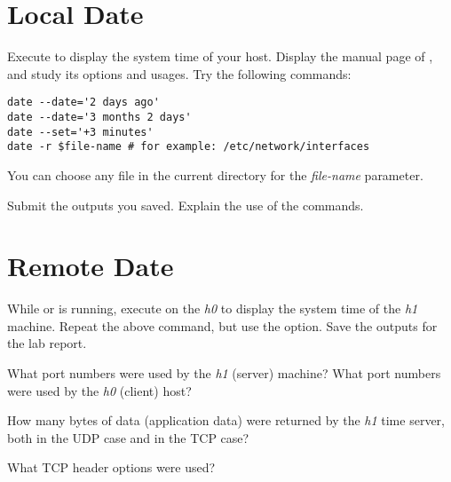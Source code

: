 \documentclass{../UTNetLab}
\begin{document}
\section{Local Date}
Execute  to display the system time of your host.
Display the manual page of , and study its options and usages.
Try the following  commands:

\begin{lstlisting}[emph={$file-name}]
date --date='2 days ago'
date --date='3 months 2 days'
date --set='+3 minutes'
date -r $file-name # for example: /etc/network/interfaces
    \end{lstlisting}
You can choose any file in the current directory for the \textit{file-name} parameter.

\begin{report}
    \item Submit the  outputs you saved.
    Explain the use of the commands.
\end{report}

\section{Remote Date}
While  or  is running, execute  on the \textit{h0} to display the system time of the \textit{h1} machine.
Repeat the above  command, but use the  option.
Save the  outputs for the lab report.

\begin{report}
    \item What port numbers were used by the \textit{h1} (server) machine?
    What port numbers were used by the \textit{h0} (client) host?

    \item How many bytes of data (application data) were returned by the \textit{h1} time server, both in the UDP case and in the TCP case?

    \item What TCP header options were used?
\end{report}
\end{document}
